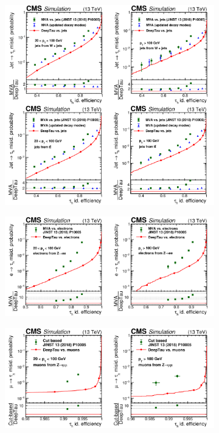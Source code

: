 \begin{figure}
    \begin{subfigure}[b]{\linewidth}
    \centering
        \includegraphics[scale=0.13]{Chapitre4/Images/DeepTauvsJets.png}
        \caption{}
    \end{subfigure}
    \begin{subfigure}[b]{\linewidth}
    \centering
        \includegraphics[scale=0.13]{Chapitre4/Images/DeepTauvsEle.png}
        \caption{}
    \end{subfigure}
    \begin{subfigure}[b]{\linewidth}
    \centering
        \includegraphics[scale=0.13]{Chapitre4/Images/DeepTauvsMu.png}

\end{subfigure}
\end{figure}
